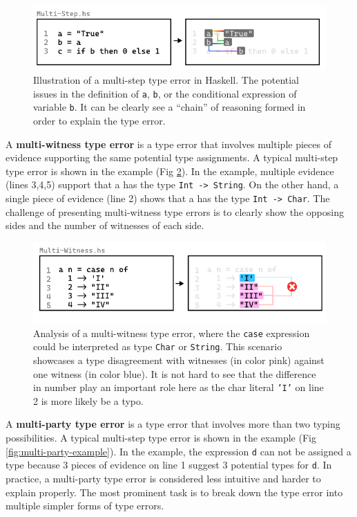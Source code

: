 \begin{figure}[hbt]
  \includegraphics[width=\linewidth]{Multi-Step}
  \caption{
    \label{fig:multi-step-example}
    Illustration of a multi-step type error in Haskell.  The potential issues in the definition of \texttt{a}, \texttt{b}, or the conditional expression of variable \texttt{b}. It can be clearly see a ``chain'' of reasoning formed in order to explain the type error. }
\end{figure}

A \textbf{multi-witness type error} is a type error that involves multiple pieces of evidence supporting the same potential type assignments.  A typical multi-step type error is shown in the example (Fig \ref{fig:multi-witness-example}). In the example, multiple evidence (lines 3,4,5) support that a has the type \texttt{Int -> String}. On the other hand, a single piece of evidence (line 2) shows that a has the type \texttt{Int -> Char}. The challenge of presenting multi-witness type errors is to clearly show the opposing sides and the number of witnesses of each side. 

\begin{figure}[hbt]
  \includegraphics[width=\linewidth]{Multi-Witness}
  \caption{
    \label{fig:multi-witness-example}
    Analysis of a multi-witness type error, where the \texttt{case} expression could be interpreted as type \texttt{Char} or \texttt{String}. This scenario showcases a type disagreement with  witnesses (in color pink) against one witness (in color blue). It is not hard to see that the difference in number play an important role here as the char literal \texttt{'I'} on line 2 is more likely be a typo.
    }
\end{figure}

A \textbf{multi-party type error} is a type error that involves more than two typing possibilities.  A typical multi-step type error is shown in the example (Fig \ref{fig:multi-party-example}). In the example, the expression \texttt{d} can not be assigned a type because 3 pieces of evidence on line 1 suggest 3 potential types for \texttt{d}. In practice, a multi-party type error is considered less intuitive and harder to explain properly. The most prominent task is to break down the type error into multiple simpler forms of type errors. 




